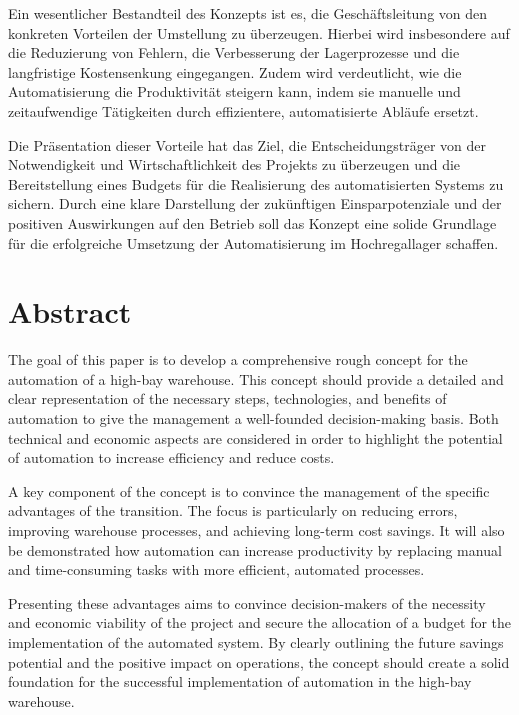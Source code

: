 Ein wesentlicher Bestandteil des Konzepts ist es, die Geschäftsleitung von den konkreten Vorteilen der Umstellung zu überzeugen. Hierbei wird insbesondere auf die Reduzierung von Fehlern, die Verbesserung der Lagerprozesse und die langfristige Kostensenkung eingegangen. Zudem wird verdeutlicht, wie die Automatisierung die Produktivität steigern kann, indem sie manuelle und zeitaufwendige Tätigkeiten durch effizientere, automatisierte Abläufe ersetzt.

Die Präsentation dieser Vorteile hat das Ziel, die Entscheidungsträger von der Notwendigkeit und Wirtschaftlichkeit des Projekts zu überzeugen und die Bereitstellung eines Budgets für die Realisierung des automatisierten Systems zu sichern. Durch eine klare Darstellung der zukünftigen Einsparpotenziale und der positiven Auswirkungen auf den Betrieb soll das Konzept eine solide Grundlage für die erfolgreiche Umsetzung der Automatisierung im Hochregallager schaffen.


\chapter*{Abstract} %
The goal of this paper is to develop a comprehensive rough concept for the automation of a high-bay warehouse. This concept should provide a detailed and clear representation of the necessary steps, technologies, and benefits of automation to give the management a well-founded decision-making basis. Both technical and economic aspects are considered in order to highlight the potential of automation to increase efficiency and reduce costs.

A key component of the concept is to convince the management of the specific advantages of the transition. The focus is particularly on reducing errors, improving warehouse processes, and achieving long-term cost savings. It will also be demonstrated how automation can increase productivity by replacing manual and time-consuming tasks with more efficient, automated processes.

Presenting these advantages aims to convince decision-makers of the necessity and economic viability of the project and secure the allocation of a budget for the implementation of the automated system. By clearly outlining the future savings potential and the positive impact on operations, the concept should create a solid foundation for the successful implementation of automation in the high-bay warehouse.
\clearpage